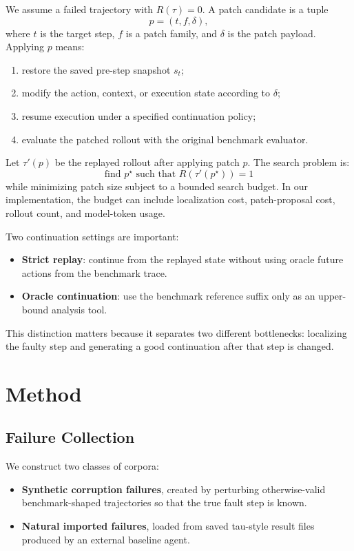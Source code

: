 \documentclass[11pt]{article}
\begin{document}
We assume a failed trajectory with $R(\tau)=0$. A patch candidate is a tuple
\[
p = (t, f, \delta),
\]
where $t$ is the target step, $f$ is a patch family, and $\delta$ is the patch
payload. Applying $p$ means:
\begin{enumerate}
  \item restore the saved pre-step snapshot $s_t$;
  \item modify the action, context, or execution state according to $\delta$;
  \item resume execution under a specified continuation policy;
  \item evaluate the patched rollout with the original benchmark evaluator.
\end{enumerate}

Let $\tau'(p)$ be the replayed rollout after applying patch $p$. The search
problem is:
\[
\text{find } p^\star \text{ such that } R(\tau'(p^\star)) = 1
\]
while minimizing patch size subject to a bounded search budget. In our
implementation, the budget can include localization cost, patch-proposal cost,
rollout count, and model-token usage.

Two continuation settings are important:
\begin{itemize}
  \item \textbf{Strict replay}: continue from the replayed state without using
  oracle future actions from the benchmark trace.
  \item \textbf{Oracle continuation}: use the benchmark reference suffix only
  as an upper-bound analysis tool.
\end{itemize}

This distinction matters because it separates two different bottlenecks:
localizing the faulty step and generating a good continuation after that step
is changed.

\section{Method}

\subsection{Failure Collection}

We construct two classes of corpora:
\begin{itemize}
  \item \textbf{Synthetic corruption failures}, created by perturbing
  otherwise-valid benchmark-shaped trajectories so that the true fault step is
  known.
  \item \textbf{Natural imported failures}, loaded from saved tau-style result
  files produced by an external baseline agent.
\end{itemize}
\end{document}
